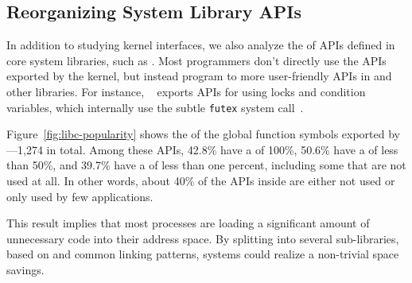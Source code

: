

\subsection{Reorganizing System Library APIs}
\label{sec:observation:libc}

In addition to studying kernel interfaces, we also analyze the \usagemetric{} of APIs
defined in core system libraries, such as \libc{}.
Most programmers don't directly use the APIs exported by the kernel,
but instead program to more user-friendly APIs in \libc{} and other libraries.
For instance, \glibc{}~\cite{glibc} exports APIs for using locks and condition variables, which internally 
use the subtle {\tt futex} system call~\cite{franke02futex}.

Figure~\ref{fig:libc-popularity} shows the \usagemetric{} of 
the global function symbols exported by 
\libc{}---1,274 in total. %
Among these APIs, 42.8\% have a \usagemetric{} of 100\%,
50.6\% have a \usagemetric{} of less than 50\%,
and 39.7\% have a \usagemetric{} of less than one percent, including some that are not used at all.
In other words, about 40\% of the APIs inside \libc{}
are either not used or only used by few applications.


This result implies that most processes are loading a significant amount of 
unnecessary code into their address space.
By splitting \libc{} into several sub-libraries, based on \usagemetric{}
and common linking patterns, systems could realize a non-trivial space savings.

